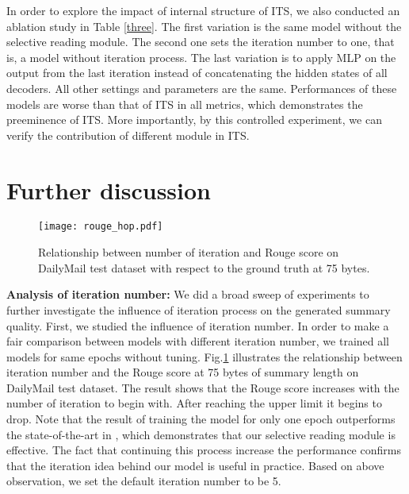 \documentclass[11pt,a4paper]{article}
\begin{document}
\begin{table}[t!]
	\begin{center}
	\end{center}
	\caption{\label{three} Ablation study on DailyMail test dataset with respect to the abstractive ground truth at 75 bytes.}
\end{table}
In order to explore the impact of internal structure of ITS, we also conducted an ablation study 
in Table \ref{three}. The first variation is the same model without the selective reading module. The second one sets the iteration number to one, that is, a model without iteration process. The last variation is to apply MLP on the output from the last iteration instead of concatenating the hidden states of all decoders.
All other settings and parameters are the same.
Performances of these models are worse than that of ITS in all metrics, which demonstrates the preeminence of ITS. 
More importantly, by this controlled experiment, we can verify the contribution of different module in ITS.
 
\section{Further discussion}
\label{greetings}


\begin{figure}
	\centering
	\texttt{[image: rouge\_hop.pdf]}
	\caption{\label{fig:rouge-hop} Relationship between number of iteration and Rouge score on DailyMail test dataset with respect to the ground truth at 75 bytes.}
\end{figure}
\textbf{Analysis of iteration number:} We did a broad sweep of experiments to further investigate the influence of iteration process on the generated summary quality. 
First, we studied the influence of iteration number.
In order to make a fair comparison between models with different iteration number, we trained all models for same epochs without tuning. 
Fig.\ref{fig:rouge-hop} illustrates the relationship between iteration number and the Rouge score at 75 bytes of summary length on DailyMail test dataset. 
The result shows that the Rouge score increases with the number of iteration to begin with.
After reaching the upper limit it begins to drop.
Note that the result of training the model for only one epoch outperforms the state-of-the-art in \cite{Singh2017Hybrid}, which demonstrates that our selective reading module is effective.
The fact that continuing this process increase the performance confirms that the iteration idea behind our model is useful in practice. Based on above observation, we set the default iteration number to be 5.
\end{document}
